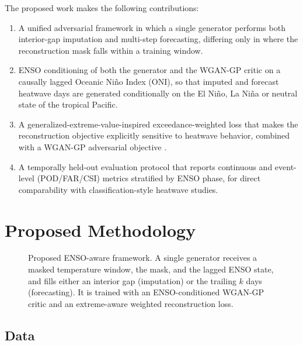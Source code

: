 \documentclass[conference]{IEEEtran}
\begin{document}
The proposed work makes the following contributions:
\begin{enumerate}
    \item A unified adversarial framework in which a single generator performs both interior-gap
    imputation and multi-step forecasting, differing only in where the reconstruction mask falls within
    a training window.
    \item ENSO conditioning of both the generator and the WGAN-GP critic on a causally lagged Oceanic
    Ni\~{n}o Index (ONI), so that imputed and forecast heatwave days are generated conditionally on the
    El Ni\~{n}o, La Ni\~{n}a or neutral state of the tropical Pacific.
    \item A generalized-extreme-value-inspired exceedance-weighted loss that makes the reconstruction
    objective explicitly sensitive to heatwave behavior, combined with a WGAN-GP adversarial objective
    \cite{arjovsky2017wasserstein,gulrajani2017improved}.
    \item A temporally held-out evaluation protocol that reports continuous and event-level
    (POD/FAR/CSI) metrics stratified by ENSO phase, for direct comparability with classification-style
    heatwave studies.
\end{enumerate}

\section{Proposed Methodology}

\begin{figure}[t]
\centering
\resizebox{\columnwidth}{!}{}
\caption{Proposed ENSO-aware framework. A single generator receives a masked temperature window, the
mask, and the lagged ENSO state, and fills either an interior gap (imputation) or the trailing $k$ days
(forecasting). It is trained with an ENSO-conditioned WGAN-GP critic and an extreme-aware weighted
reconstruction loss.}
\label{fig:framework}
\end{figure}

\subsection{Data}
\end{document}
